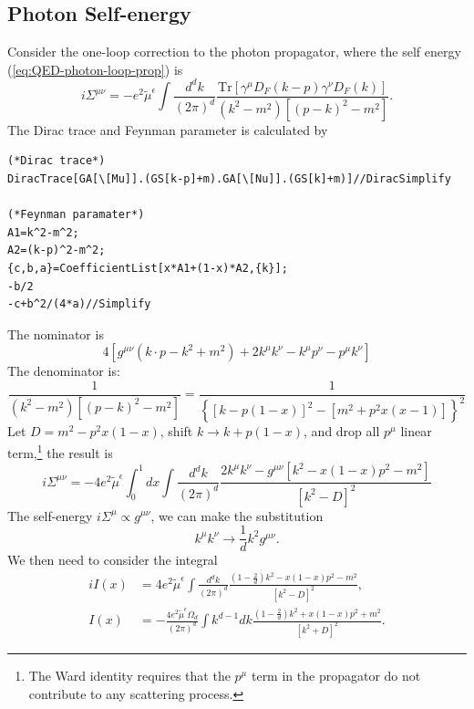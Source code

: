\subsection{Photon Self-energy}
Consider the one-loop correction to the photon propagator, where the self energy (\ref{eq:QED-photon-loop-prop}) is
\begin{equation}
	i \Sigma^{\mu\nu}
	= -e^2\tilde{\mu}^{\epsilon} \int\frac{d^d k}{(2\pi)^d} 
	\frac{\mathrm{Tr}\left[\gamma^\mu D_F(k-p) \gamma^\nu D_F(k) \right]}{(k^2-m^2)[(p-k)^2-m^2]}.
\end{equation}
The Dirac trace and Feynman parameter is calculated by
\begin{lstlisting}[style=mathematicaFrameTB]
(*Dirac trace*)
DiracTrace[GA[\[Mu]].(GS[k-p]+m).GA[\[Nu]].(GS[k]+m)]//DiracSimplify

(*Feynman paramater*)
A1=k^2-m^2;
A2=(k-p)^2-m^2;
{c,b,a}=CoefficientList[x*A1+(1-x)*A2,{k}];
-b/2
-c+b^2/(4*a)//Simplify
\end{lstlisting}
The nominator is
\begin{equation*}
	4 \left[g^{\mu\nu} \left(k\cdot p-{k}^2+m^2\right)+ 2k^\mu k^\nu - k^\mu p^\nu - p^\mu k^\nu \right]
\end{equation*}
The denominator is:
\begin{equation*}
	\frac{1}{(k^2-m^2)[(p-k)^2-m^2]}
	= \frac{1}{\left\{[k-p(1-x)]^2-[m^2+p^2 x(x-1)]\right\}^2}
\end{equation*}
Let $D=m^2-p^2 x(1-x)$, shift $k \rightarrow k + p(1-x)$, and drop all $p^\mu$ linear term,\footnote{The Ward identity requires that the $p^\mu$ term in the propagator do not contribute to any scattering process.} the result is
\begin{equation}
	i\Sigma^{\mu \nu}= -4 e^{2}\tilde{\mu}^{\epsilon} \int_0^1 dx
		\int \frac{d^{d} k}{(2 \pi)^{d}}  \frac{2 k^{\mu} k^{\nu}-g^{\mu \nu}\left[k^{2}-x(1-x) p^{2}-m^{2}\right]}{\left[k^{2}-D\right]^{2}}
\end{equation}
The self-energy $i\Sigma^\mu \propto g^{\mu\nu}$, we can make the substitution
\begin{equation*}
	k^\mu k^\nu \rightarrow \frac{1}{d} k^2 g^{\mu\nu}.
\end{equation*}
We then need to consider the integral
\begin{equation*}
\begin{aligned}
	iI(x) &= 4e^2\tilde{\mu}^{\epsilon} \int\frac{d^d k}{(2 \pi)^{d}}  
		\frac{(1-\frac{2}{d})k^{2}-x(1-x) p^{2}-m^{2}}{\left[k^{2}-D\right]^{2}}, \\
	I(x) &= -\frac{4e^2\tilde{\mu}^{\epsilon} \Omega_d }{(2\pi)^d}
		\int k^{d-1} dk \frac{(1-\frac{2}{d})k^{2}+x(1-x) p^{2}+m^{2}}{\left[k^{2}+D\right]^{2}}.
\end{aligned}
\end{equation*}
